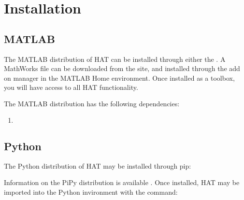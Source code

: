 \documentclass[letterpaper,10pt,english]{sphinxmanual}
\begin{document}
\chapter{Installation}
\label{\detokenize{index:installation}}

\section{MATLAB}
\label{\detokenize{index:matlab}}
\sphinxAtStartPar
The MATLAB distribution of HAT can be installed through either the . A MathWorks  file can be downloaded from the site,
and installed through the add on manager in the MATLAB Home environment. Once installed as a toolbox, you will have access to all HAT functionality.

\sphinxAtStartPar
The MATLAB distribution has the following dependencies:
\begin{enumerate}
%
\item {} 
\sphinxAtStartPar
{}

\end{enumerate}


\section{Python}
\label{\detokenize{index:python}}
\sphinxAtStartPar
The Python distribution of HAT may be installed through pip:

\begin{sphinxVerbatim}[commandchars=\\\{\}]
   
\end{sphinxVerbatim}

\sphinxAtStartPar
Information on the PiPy distribution is available . Once installed, HAT may be imported into the Python invironment with the command:

\begin{sphinxVerbatim}[commandchars=\\\{\}]
               
    
          
\end{sphinxVerbatim}
\end{document}
